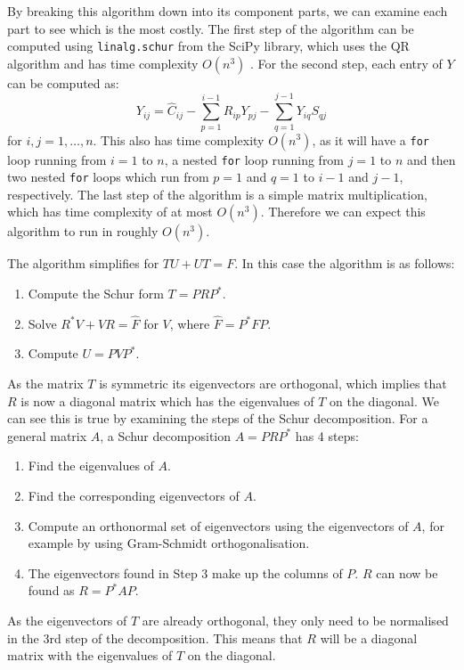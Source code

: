 \documentclass[11pt]{article}
\numberwithin{equation}{section}
\begin{document}
By breaking this algorithm down into its component parts, we can examine each part to see which is the most costly. The first step of the algorithm can be computed using \texttt{linalg.schur} from the SciPy library, which uses the QR algorithm and has time complexity $O(n^3)$ \cite{Parlett}. For the second step, each entry of $Y$ can be computed as:
\begin{equation}
Y_{ij} = \hat{C}_{ij} - \sum_{p=1}^{i-1} R_{ip}Y_{pj} - \sum_{q=1}^{j-1} Y_{iq}S_{qj}
\end{equation}
for $i,j=1, \dots, n$. This also has time complexity $O(n^3)$, as it will have a \texttt{for} loop running from $i=1$ to $n$, a nested \texttt{for} loop running from $j=1$ to $n$ and then two nested \texttt{for} loops which run from $p=1$ and $q=1$ to $i-1$ and $j-1$, respectively. The last step of the algorithm is a simple matrix multiplication, which has time complexity of at most $O(n^3)$. Therefore we can expect this algorithm to run in roughly $O(n^3)$. 

The algorithm simplifies for $TU+UT=F$. In this case the algorithm is as follows:
\begin{enumerate}
\item Compute the Schur form $T=PRP^*$.
\item Solve $R^*V + VR = \hat{F}$ for $V$, where $\hat{F} =  P^*FP$.
\item Compute $U=PVP^*$.
\end{enumerate}
As the matrix $T$ is symmetric its eigenvectors are orthogonal, which implies that $R$ is now a diagonal matrix which has the eigenvalues of $T$ on the diagonal. We can see this is true by examining the steps of the Schur decomposition. For a general matrix $A$, a Schur decomposition $A=PRP^*$ has 4 steps:
\begin{enumerate}
\item Find the eigenvalues of $A$.
\item Find the corresponding eigenvectors of $A$.
\item Compute an orthonormal set of eigenvectors using the eigenvectors of $A$, for example by using Gram-Schmidt orthogonalisation.
\item The eigenvectors found in Step 3 make up the columns of $P$. $R$ can now be found as $R=P^*AP$. 
\end{enumerate}
As the eigenvectors of $T$ are already orthogonal, they only need to be normalised in the 3rd step of the decomposition. This means that $R$ will be a diagonal matrix with the eigenvalues of $T$ on the diagonal.
\end{document}
